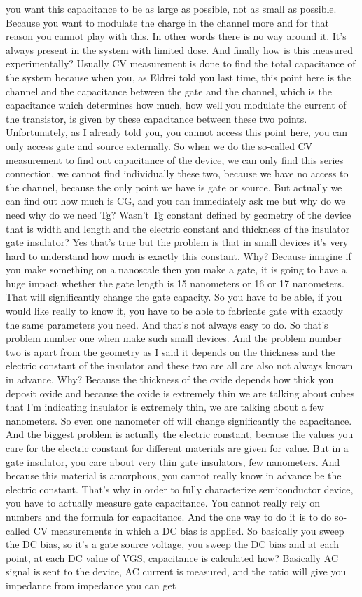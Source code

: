 you want this capacitance to be as large as possible, not as small as possible. Because you want to modulate the charge in the channel more and for that reason you cannot play with this. In other words there is no way around it. It's always present in the system with limited dose. And finally how is this measured experimentally? Usually CV measurement is done to find the total capacitance of the system because when you, as Eldrei told you last time, this point here is the channel and the capacitance between the gate and the channel, which is the capacitance which determines how much, how well you modulate the current of the transistor, is given by these capacitance between these two points. Unfortunately, as I already told you, you cannot access this point here, you can only access gate and source externally. So when we do the so-called CV measurement to find out capacitance of the device, we can only find this series connection, we cannot find individually these two, because we have no access to the channel, because the only point we have is gate or source. But actually we can find out how much is CG, and you can immediately ask me but why do we need why do we need Tg? Wasn't Tg constant defined by geometry of the device that is width and length and the electric constant and thickness of the insulator gate insulator? Yes that's true but the problem is that in small devices it's very hard to understand how much is exactly this constant. Why? Because imagine if you make something on a nanoscale then you make a gate, it is going to have a huge impact whether the gate length is 15 nanometers or 16 or 17 nanometers. That will significantly change the gate capacity. So you have to be able, if you would like really to know it, you have to be able to fabricate gate with exactly the same parameters you need. And that's not always easy to do. So that's problem number one when make such small devices. And the problem number two is apart from the geometry as I said it depends on the thickness and the electric constant of the insulator and these two are all are also not always known in advance. Why? Because the thickness of the oxide depends how thick you deposit oxide and because the oxide is extremely thin we are talking about cubes that I'm indicating insulator is extremely thin, we are talking about a few nanometers. So even one nanometer off will change significantly the capacitance. And the biggest problem is actually the electric constant, because the values you care for the electric constant for different materials are given for value. But in a gate insulator, you care about very thin gate insulators, few nanometers. And because this material is amorphous, you cannot really know in advance be the electric constant. That's why in order to fully characterize semiconductor device, you have to actually measure gate capacitance. You cannot really rely on numbers and the formula for capacitance. And the one way to do it is to do so-called CV measurements in which a DC bias is applied. So basically you sweep the DC bias, so it's a gate source voltage, you sweep the DC bias and at each point, at each DC value of VGS, capacitance is calculated how? Basically AC signal is sent to the device, AC current is measured, and the ratio will give you impedance from impedance you can get 